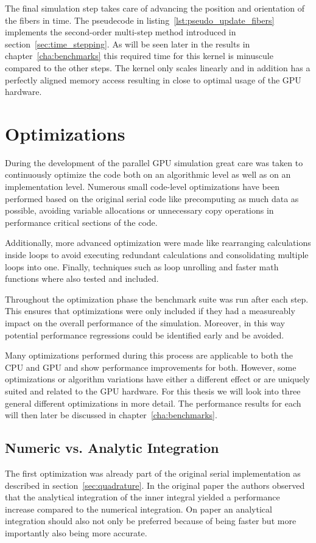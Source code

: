 \documentclass[a4paper,11pt]{kth-mag}
\begin{document}
The final simulation step takes care of advancing the position and orientation of the fibers in time. The pseudecode in listing~\ref{lst:pseudo_update_fibers} implements the second-order multi-step method introduced in section~\ref{sec:time_stepping}. As will be seen later in the results in chapter~\ref{cha:benchmarks} this required time for this kernel is minuscule compared to the other steps. The kernel only scales linearly and in addition has a perfectly aligned memory access resulting in close to optimal usage of the GPU hardware.

\section{Optimizations}
\label{sec:optimizations}

During the development of the parallel GPU simulation great care was taken to continuously optimize the code both on an algorithmic level as well as on an implementation level. Numerous small code-level optimizations have been performed based on the original serial code like precomputing as much data as possible, avoiding variable allocations or unnecessary copy operations in performance critical sections of the code.

Additionally, more advanced optimization were made like rearranging calculations inside loops to avoid executing redundant calculations and consolidating multiple loops into one. Finally, techniques such as loop unrolling and faster math functions where also tested and included.

Throughout the optimization phase the benchmark suite was run after each step. This ensures that optimizations were only included if they had a measureably impact on the overall performance of the simulation. Moreover, in this way potential performance regressions could be identified early and be avoided.

Many optimizations performed during this process are applicable to both the CPU and GPU and show performance improvements for both. However, some optimizations or algorithm variations have either a different effect or are uniquely suited and related to the GPU hardware. For this thesis we will look into three general different optimizations in more detail. The performance results for each will then later be discussed in chapter~\ref{cha:benchmarks}.

\subsection{Numeric vs. Analytic Integration}
\label{subsec:numeric_analytic}
The first optimization was already part of the original serial implementation as described in section~\ref{sec:quadrature}. In the original paper \cite{} the authors observed that the analytical integration of the inner integral yielded a performance increase compared to the numerical integration. On paper an analytical integration should also not only be preferred because of being faster but more importantly also being more accurate.
\end{document}
